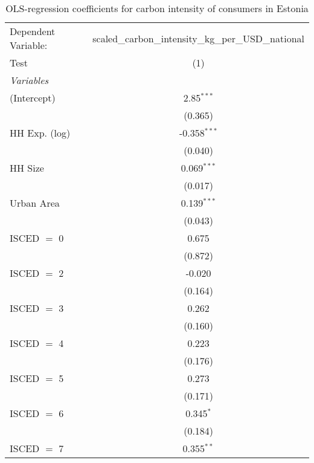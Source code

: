 
\begin{table}[htbp!]
   \centering
   \small
   \begin{adjustbox}{width = 1\textwidth, max height = 0.95\textheight, center}
      \begin{threeparttable}[b]
         \caption{\label{tab:OLS_1_EST} OLS-regression coefficients for carbon intensity of consumers in Estonia}
         \begin{tabular}{lc}
            \tabularnewline \midrule \midrule
            Dependent Variable: & scaled\_carbon\_intensity\_kg\_per\_USD\_national\\        
            Test                & (1)\\  
            \midrule
            \emph{Variables}\\
            (Intercept)         & 2.85$^{***}$\\   
                                & (0.365)\\   
            HH Exp. (log)       & -0.358$^{***}$\\   
                                & (0.040)\\   
            HH Size             & 0.069$^{***}$\\   
                                & (0.017)\\   
            Urban Area          & 0.139$^{***}$\\   
                                & (0.043)\\   
            ISCED $=$ 0         & 0.675\\   
                                & (0.872)\\   
            ISCED $=$ 2         & -0.020\\   
                                & (0.164)\\   
            ISCED $=$ 3         & 0.262\\   
                                & (0.160)\\   
            ISCED $=$ 4         & 0.223\\   
                                & (0.176)\\   
            ISCED $=$ 5         & 0.273\\   
                                & (0.171)\\   
            ISCED $=$ 6         & 0.345$^{*}$\\   
                                & (0.184)\\   
            ISCED $=$ 7         & 0.355$^{**}$\\   

\end{tabular}
\end{threeparttable}
\end{adjustbox}
\end{table}
